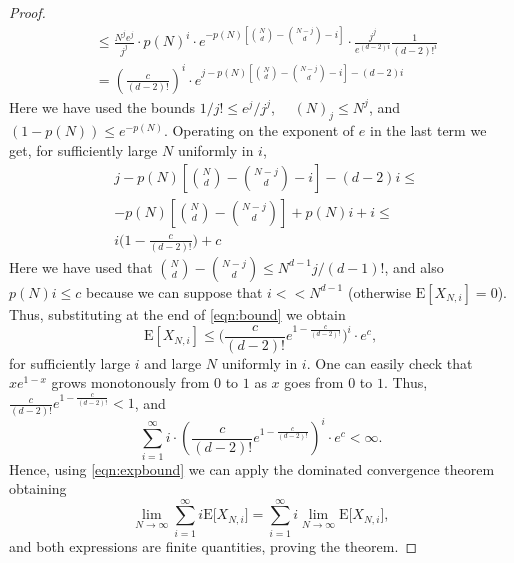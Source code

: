 \documentclass[11pt,notitlepage,a4paper]{article}
\theoremstyle{definition}
\newcommand{\LN}{\lim\limits_{N\to \infty}}
\begin{document}
\begin{proof}
\begin{align}
	&\nonumber \leq \frac{N^{j}e^{j}}{j^j}\cdot 
	p(N)^i \cdot
	e^{-p(N)\left[\binom{N}{d}-\binom{N-j}{d} - i\right]}
	\cdot \frac{j^j}{e^{(d-2)i}}\frac{1}{(d-2)!^i}\\
	&\label{eqn:bound} =\left(\frac{c}{(d-2)!}\right)^i 
	\cdot
	e^{j-p(N)\left[\binom{N}{d}-\binom{N-j}{d} - i\right]- 
	(d-2)i} 
	\end{align}
	Here we have used the bounds
	$1/j!\leq e^j/j^j$, $\quad (N)_j\leq
	N^j$, and 
	$(1-p(N))\leq e^{-p(N)}$.
	Operating on the exponent of $e$ in the last term
	we get, for sufficiently large $N$ uniformly in 
	$i$,
	\begin{align*}
	&j
	-p(N)\left[\binom{N}{d}-\binom{N-j}{d} - i\right]- 
	(d-2)i \leq \\ 
	&- p(N)\left[\binom{N}{d}-\binom{N-j}{d}\right]
	+ p(N)i + i \leq \\
	& i\Big(1 - \frac{c}{(d-2)!}\Big) + c
	\end{align*}
	Here we have used that
	$\binom{N}{d}-\binom{N-j}{d}\leq N^{d-1}j/(d-1)!$,
	and also $p(N)i\leq c$ because we can suppose that $i<<N^{d-1}$ (otherwise 
	$\mathrm{E}[X_{N,i}]=0$).
	Thus, substituting at the end of 
	\cref{eqn:bound} we obtain
	\begin{equation}
	\label{eqn:expbound}
		\mathrm{E}[X_{N,i}]\leq \Bigg(\frac{c}{(d-2)!}
		e^{1-\frac{c}{(d-2)!}} \Bigg)^i \cdot e^c,
	\end{equation}
	for sufficiently large $i$ and large $N$ uniformly
	in $i$. 
	One can easily check that $xe^{1-x}$ grows monotonously from $0$
	to $1$ as $x$ goes from $0$ to $1$. Thus, $\frac{c}{(d-2)!}
	e^{1-\frac{c}{(d-2)!}}<1$, and
	\[
	\sum_{i=1}^\infty i\cdot\left(\frac{c}{(d-2)!}
	e^{1-\frac{c}{(d-2)!}} \right)^i\cdot e^c < \infty.
	\]
	Hence, using \cref{eqn:expbound} we can
	apply the dominated convergence theorem
	obtaining
	\[
	\LN \sum_{i=1}^\infty i 
	\mathrm{E}\big[ X_{N,i}\big]
	= \sum_{i=1}^\infty i \LN \mathrm{E}\big[ X_{N,i}\big]
	,
	\]
	and both expressions are finite quantities, proving
	the theorem. 
	\end{proof}
	
\end{document}

